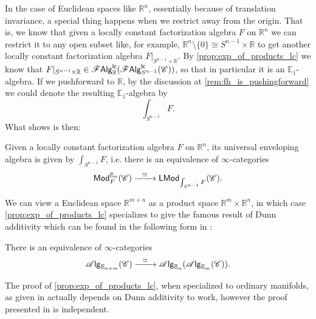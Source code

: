 \documentclass[../text]{subfiles}
\begin{document}
\begin{remark}
    In the case of Euclidean spaces like $\mathbb{R}^n$, essentially because of translation invariance, a special thing happens when we restrict away from the origin. That is, we know that given a locally constant factorization algebra $F$ on $\mathbb{R}^n$ we can restrict it to any open subset like, for example, $\mathbb{R}^n \setminus \{ 0 \} \cong S^{n-1} \times \mathbb{R}$ to get another locally constant factorization algebra $F|_{S^{n-1} \times \mathbb{R}}$. By \cref{prop:exp_of_products_lc} we know that $F|_{S^{n-1} \times \mathbb{R}} \in \mathscr{F} \mathsf{Alg}^{\mathsf{lc}}_{\mathbb{R}} (\mathscr{F} \mathsf{Alg}^{\mathsf{lc}}_{S^{n-1}} (\mathscr{C}))$, so that in particular it is an $\mathbb{E}_1$-algebra. If we pushforward to $\mathbb{R}$, by the discussion at \cref{rem:fh_is_pushingforward} we could denote the resulting $\mathbb{E}_1$-algebra by
    \begin{equation}
        \int_{S^{n-1}} F.
    \end{equation}
    What \cite[prop.3.16]{francis2013} shows is then:
\end{remark}

\begin{proposition}\label{univ_env_for_En}
    Given a locally constant factorization algebra $F$ on $\mathbb{R}^n$, its universal enveloping algebra is given by $\int_{S^{n-1}} F$, i.e. there is an equivalence of $\infty$-categories
    \begin{equation}
        \mathsf{Mod}^{\mathbb{E}_n}_{F} (\mathscr{C}) \xrightarrow{\ \ \simeq \ \ } \mathsf{LMod}_{\int_{S^{n-1}} F} (\mathscr{C}).
    \end{equation}
\end{proposition}

We can view a Euclidean space $\mathbb{R}^{m+n}$ as a product space $\mathbb{R}^m \times \mathbb{R}^n$, in which case \cref{prop:exp_of_products_lc} specializes to give the famous result of Dunn additivity \cite{dunn1988} which can be found in the following form in \cite{lurie_ha}:

\begin{proposition}\label{prop:dunn_additivity}
    There is an equivalence of $\infty$-categories
    \begin{equation}
        \mathscr{A} \mathsf{lg}_{\mathbb{E}_{n + m}} (\mathscr{C}) \xrightarrow{\ \ \simeq \ \ } \mathscr{A} \mathsf{lg}_{\mathbb{E}_n} (\mathscr{A} \mathsf{lg}_{\mathbb{E}_m} (\mathscr{C})). 
    \end{equation}
\end{proposition}

\begin{remark}
    The proof of \cref{prop:exp_of_products_lc}, when specialized to ordinary manifolds, as given in \cite{ginot2015} actually depends on Dunn additivity to work, however the proof presented in \cite{lurie_ha} is independent. 
\end{remark}
\end{document}
